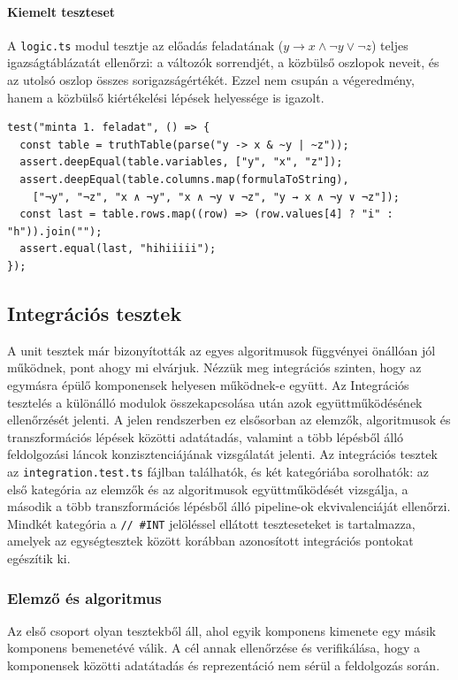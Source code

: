\paragraph{Kiemelt teszteset} A \texttt{logic.ts} modul tesztje az előadás feladatának ($y \to x \land \lnot y \lor \lnot z$) teljes igazságtáblázatát ellenőrzi: a változók sorrendjét, a közbülső oszlopok neveit, és az utolsó oszlop összes sorigazságértékét. Ezzel nem csupán a végeredmény, hanem a közbülső kiértékelési lépések helyessége is igazolt.
\begin{lstlisting}
test("minta 1. feladat", () => {
  const table = truthTable(parse("y -> x & ~y | ~z"));
  assert.deepEqual(table.variables, ["y", "x", "z"]);
  assert.deepEqual(table.columns.map(formulaToString),
    ["¬y", "¬z", "x ∧ ¬y", "x ∧ ¬y ∨ ¬z", "y → x ∧ ¬y ∨ ¬z"]);
  const last = table.rows.map((row) => (row.values[4] ? "i" : "h")).join("");
  assert.equal(last, "hihiiiii");
});
\end{lstlisting}

\subsection{Integrációs tesztek}
A unit tesztek már bizonyították az egyes algoritmusok függvényei önállóan jól működnek, pont ahogy mi elvárjuk.
Nézzük meg integrációs szinten, hogy az egymásra épülő komponensek
 helyesen működnek-e együtt. 
 Az Integrációs tesztelés a különálló modulok összekapcsolása után azok 
 együttműködésének ellenőrzését jelenti. 
 A jelen rendszerben ez elsősorban az elemzők, algoritmusok és 
 transzformációs lépések közötti adatátadás, 
 valamint a több lépésből álló feldolgozási láncok konzisztenciájának
  vizsgálatát jelenti.
Az integrációs tesztek az \texttt{integration.test.ts} fájlban találhatók,
 és két kategóriába sorolhatók: 
 az első kategória az elemzők és az algoritmusok együttműködését vizsgálja,
  a második a több transzformációs lépésből álló pipeline-ok ekvivalenciáját 
  ellenőrzi. 
  Mindkét kategória a \texttt{// \#INT} jelöléssel ellátott 
  teszteseteket is tartalmazza, 
  amelyek az egységtesztek között korábban azonosított integrációs 
  pontokat egészítik ki.

\subsubsection*{Elemző és algoritmus}
Az első csoport olyan tesztekből áll, 
ahol egyik komponens kimenete egy másik komponens bemenetévé válik.
A cél annak ellenőrzése és verifikálása, hogy a komponensek közötti 
adatátadás és reprezentáció nem sérül a feldolgozás során.

